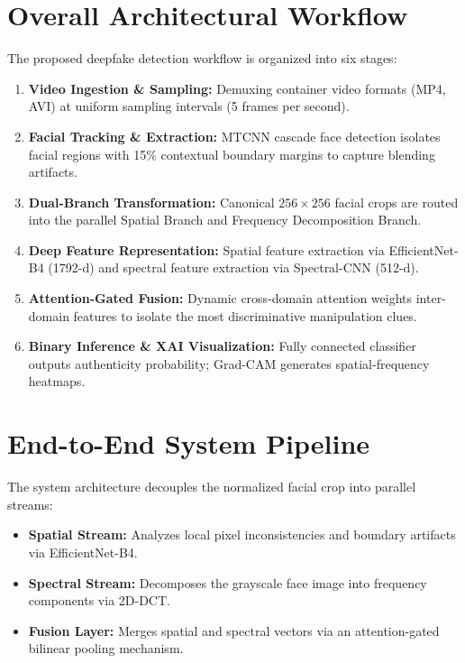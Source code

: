 \documentclass[12pt,a4paper]{report}
\begin{document}
\section{Overall Architectural Workflow}
The proposed deepfake detection workflow is organized into six stages:
\begin{enumerate}
    \item \textbf{Video Ingestion \& Sampling:} Demuxing container video formats (MP4, AVI) at uniform sampling intervals (5 frames per second).
    \item \textbf{Facial Tracking \& Extraction:} MTCNN cascade face detection isolates facial regions with 15\% contextual boundary margins to capture blending artifacts.
    \item \textbf{Dual-Branch Transformation:} Canonical $256 \times 256$ facial crops are routed into the parallel Spatial Branch and Frequency Decomposition Branch.
    \item \textbf{Deep Feature Representation:} Spatial feature extraction via EfficientNet-B4 (1792-d) and spectral feature extraction via Spectral-CNN (512-d).
    \item \textbf{Attention-Gated Fusion:} Dynamic cross-domain attention weights inter-domain features to isolate the most discriminative manipulation clues.
    \item \textbf{Binary Inference \& XAI Visualization:} Fully connected classifier outputs authenticity probability; Grad-CAM generates spatial-frequency heatmaps.
\end{enumerate}

\section{End-to-End System Pipeline}
The system architecture decouples the normalized facial crop into parallel streams:
\begin{itemize}
    \item \textbf{Spatial Stream:} Analyzes local pixel inconsistencies and boundary artifacts via EfficientNet-B4.
    \item \textbf{Spectral Stream:} Decomposes the grayscale face image into frequency components via 2D-DCT.
    \item \textbf{Fusion Layer:} Merges spatial and spectral vectors via an attention-gated bilinear pooling mechanism.
\end{itemize}
\end{document}
